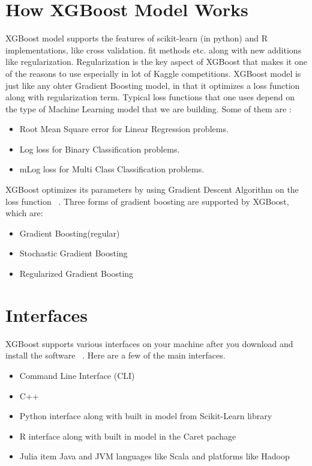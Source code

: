 \section{How XGBoost Model Works}

XGBoost model supports the features of scikit-learn (in python) and R
implementations, like cross validation. fit methods etc. along with new
additions like regularization.  Regularization is the key aspect of XGBoost that
makes it one of the reasons to use especially in  lot of Kaggle competitions.
XGBoost model is just like any ohter Gradient Boosting model, in that it
optimizes a loss function  along with regularization term. Typical loss
functions that one uses depend on the type of Machine Learning model that we are
building. Some of them are :

\begin{itemize}
\item Root Mean Square error for Linear Regression problems. 
\item Log loss for Binary Classification problems. 
\item mLog loss for Multi Class Classification problems.
\end{itemize}

XGBoost optimizes its parameters by using Gradient Descent Algorithm on the loss
function ~\cite{hid-sp18-401-XGBoost-MLmastery}. Three forms of gradient
boosting  are supported by XGBoost, which are:

\begin{itemize}
\item Gradient Boosting(regular)
\item Stochastic Gradient Boosting
\item Regularized Gradient Boosting 
\end{itemize}



\section{Interfaces}

XGBoost supports various interfaces on your machine after you download and
install the software ~\cite{hid-sp18-401-XGBoost-MLmastery}. Here are a few 
of the main interfaces.

\begin{itemize}
\item Command Line Interface (CLI)  
\item C++  
\item Python interface along with built in model from Scikit-Learn library   
\item R interface along with built in model in the Caret pachage  
\item Julia item Java and JVM languages like Scala and platforms like Hadoop
\end{itemize}



